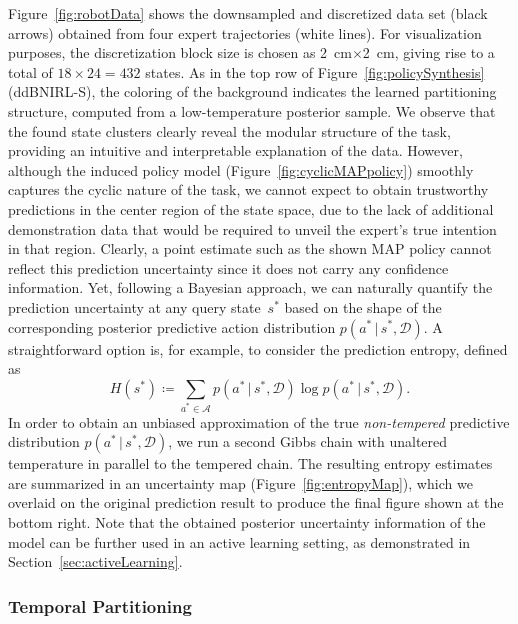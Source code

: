 \documentclass[twoside,11pt]{article}
\newcommand{\p}{p}
\newcommand{\given}{\,\vert\,}
\newcommand{\defeq}{\coloneqq}
\newcommand{\eqpunkt}{.}
\newcommand{\ddBNIRLS}{\mbox{ddBNIRL-S}}
\begin{document}
Figure~\ref{fig:robotData} shows the %
downsampled and discretized data set (black arrows) obtained from four expert trajectories (white lines). For visualization purposes, the discretization block size is chosen as \SI{2}{\centi\metre}$\times$\SI{2}{\centi\metre}, giving rise to a total of $18\times24=432$ states. %
As in the top row of Figure~\ref{fig:policySynthesis} (\ddBNIRLS), the coloring of the background indicates the learned partitioning structure, computed from a low-temperature posterior sample. We observe that the found state clusters clearly reveal the modular structure of the %
task, providing an intuitive and interpretable explanation of the data. 
However, although the induced %
policy model (Figure~\ref{fig:cyclicMAPpolicy}) %
smoothly captures the cyclic nature of the task, %
%
%
we cannot expect %
to obtain trustworthy predictions %
in the center region of the state space, due to the lack of additional 
demonstration data %
that %
would be required to unveil the expert's true intention in that region. Clearly, a point estimate %
 such as the shown MAP policy cannot reflect this prediction uncertainty since it does not carry any confidence information. Yet, following a Bayesian approach, %
we %
can naturally quantify the %
prediction 
uncertainty at any query state~$s^*$ based on  the %
shape of the corresponding posterior predictive action
distribution $\p(a^* \given s^*, \mathcal{D})$. %
A straightforward option %
is, for example, to consider the prediction entropy, defined as
\begin{equation*}
	H(s^*) \defeq \sum_{a^*\in\mathcal{A}} \p(a^* \given s^*, \mathcal{D}) \log\p(a^* \given s^*, \mathcal{D}) \eqpunkt
\end{equation*}
In order to obtain an unbiased approximation of the true \textit{non-tempered} predictive distribution $\p(a^* \given s^*, \mathcal{D})$, we run a second Gibbs chain with unaltered temperature in parallel to the tempered chain. The %
resulting entropy %
estimates are summarized in an uncertainty map (Figure~\ref{fig:entropyMap}), which we overlaid on the original prediction result to produce the final figure shown at the bottom right. 
%
Note that %
the obtained posterior uncertainty information of the model can be further used in an active learning setting, as demonstrated in Section~\ref{sec:activeLearning}.


\subsubsection{Temporal Partitioning}
\label{sec:KUKAtemporal}
\end{document}
